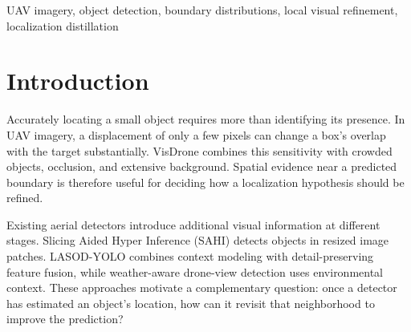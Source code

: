 \raggedbottom
\maketitle


\begin{abstract}

Small objects in UAV imagery are sensitive to boundary errors, making local visual evidence important for precise detection. We introduce a local visual expert that revisits predicted box neighborhoods in a distributional RT-DETR detector. Built on the boundary representation of D-FINE, the expert samples multiscale features around each box and predicts residual updates to classification and edge distributions. Its directly supervised predictions also provide localization targets for the decoder, selected through matching, boundary-support, and quality checks. A shared P3 refinement branch supplies features to both prediction paths. On converted-label VisDrone, the complete system achieves 30.109 validation AP and 23.604 test AP, improving test AP over the stock RT-DETR-L baseline by 5.861 points. A matched validation comparison shows a 0.832-point benefit from shared P3 refinement within the expert-equipped detector. Full reaches 74.129 images/s in a fixed-input FP32 benchmark at $640\times640$ on RTX 4090 with batch eight.


\end{abstract}
\begin{keywords}UAV imagery, object detection, boundary distributions, local visual refinement, localization distillation\end{keywords}

\section{Introduction}

Accurately locating a small object requires more than identifying its presence. In UAV imagery, a displacement of only a few pixels can change a box's overlap with the target substantially. VisDrone \cite{zhu2018visdrone} combines this sensitivity with crowded objects, occlusion, and extensive background. Spatial evidence near a predicted boundary is therefore useful for deciding how a localization hypothesis should be refined.


Existing aerial detectors introduce additional visual information at different stages. Slicing Aided Hyper Inference (SAHI) \cite{akyon2022sahi} detects objects in resized image patches. LASOD-YOLO \cite{wang2026lasod} combines context modeling with detail-preserving feature fusion, while weather-aware drone-view detection \cite{kim2024weather} uses environmental context. These approaches motivate a complementary question: once a detector has estimated an object's location, how can it revisit that neighborhood to improve the prediction?


